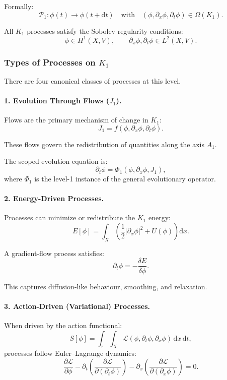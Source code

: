 Formally:
\[
\mathcal{P}_1: \phi(t) \longrightarrow \phi(t+\mathrm{d}t)
\quad \text{with} \quad
(\phi, \partial_x \phi, \partial_t \phi) \in \Omega(K_1).
\]

All $K_1$ processes satisfy the Sobolev regularity conditions:
\[
\phi \in H^1(X,V),
\qquad
\partial_x \phi, \partial_t \phi \in L^2(X,V).
\]

\subsubsection{Types of Processes on \texorpdfstring{$K_1$}{K_1}}

There are four canonical classes of processes at this level.

\paragraph{1. Evolution Through Flows (\texorpdfstring{$J_1$}{J_1}).}

Flows are the primary mechanism of change in $K_1$:
\[
J_1 = f(\phi, \partial_x\phi, \partial_t\phi).
\]

These flows govern the redistribution of quantities along the axis $A_1$.

The scoped evolution equation is:
\[
\partial_t \phi = \Phi_1(\phi, \partial_x \phi, J_1),
\]
where $\Phi_1$ is the level-1 instance of the general evolutionary operator.

\paragraph{2. Energy-Driven Processes.}

Processes can minimize or redistribute the $K_1$ energy:
\[
E[\phi] = \int_X \left( 
\frac{1}{2} |\partial_x \phi|^2 + U(\phi)
\right) \mathrm{d}x.
\]

A gradient-flow process satisfies:
\[
\partial_t \phi = - \frac{\delta E}{\delta \phi}.
\]

This captures diffusion-like behaviour, smoothing, and relaxation.

\paragraph{3. Action-Driven (Variational) Processes.}

When driven by the action functional:
\[
S[\phi] = \int_{\tau} \int_X
\mathcal{L}(\phi, \partial_t\phi, \partial_x\phi) \, \mathrm{d}x \, \mathrm{d}t,
\]
processes follow Euler–Lagrange dynamics:
\[
\frac{\partial \mathcal{L}}{\partial \phi}
- \partial_t \left( \frac{\partial \mathcal{L}}{\partial(\partial_t \phi)} \right)
- \partial_x \left( \frac{\partial \mathcal{L}}{\partial(\partial_x \phi)} \right)
= 0.
\]

